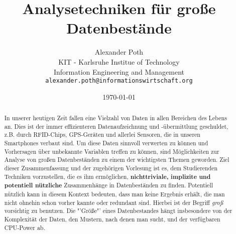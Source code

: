 \documentclass[12pt,a4paper]{article}
\begin{document}
\title{Analysetechniken für große Datenbestände}
\author{Alexander Poth \\
	KIT - Karlsruhe Institue of Technology \\
	Information Engineering and Management\\
	\texttt{alexander.poth@informationswirtschaft.org}}
\date{\today}
\maketitle
\newpage
\begin{abstract}
In unserer heutigen Zeit fallen eine Vielzahl von Daten in allen Bereichen des 
Lebens an. Dies ist der immer effizienteren Datenaufzeichnung und -übermittlung 
geschuldet, z.B. durch RFID-Chips, GPS-Geräten und allerlei Sensoren, die in
unseren Smartphones verbaut sind. Um diese Daten sinnvoll verwerten zu können und
Vorhersagen über unbekannte Variablen treffen zu können, sind Möglichkeiten zur 
Analyse von großen Datenbeständen zu einem der wichtigsten Themen geworden. Ziel 
dieser Zusammenfassung und der zugehörigen Vorlesung ist es, dem Studierenden 
Techniken vorzustellen, die es ihm ermöglichen, \textbf{nichttriviale, implizite 
und potentiell nützliche} Zusammenhänge in Datenbeständen zu finden. Potentiell nützlich 
kann in diesem Kontext bedeuten, dass man keine Ergebnis erhält, die man nicht ohnehin 
schon vorher kannte oder redundant sind. Hierbei ist der Begriff \textit{groß} 
vorsichtig zu benutzen. Die "'Größe"' eines Datenbestandes hängt insbesondere von der
Komplexität der Daten, den Mustern, nach denen man sucht, und der verfügbaren CPU-Power ab.
\end{abstract}
\newpage
\tableofcontents
\newpage
{}


\newpage

\newpage

\newpage

\newpage

\newpage

\newpage

\newpage

\newpage

\newpage

\newpage


\FloatBarrier


	
\end{document}
